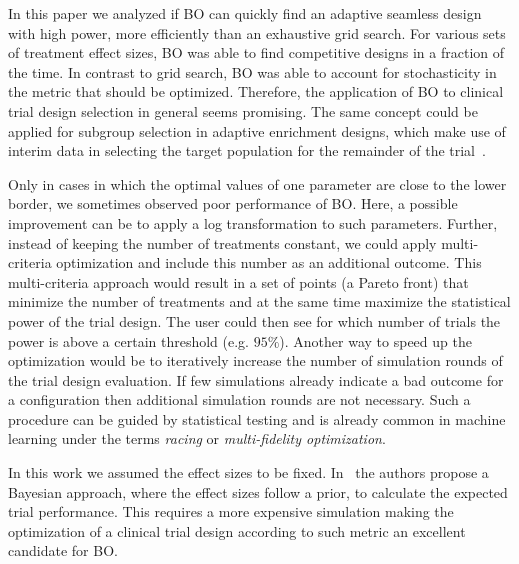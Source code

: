 \documentclass[bimj,fleqn]{w-art}
\theoremstyle{plain}
\theoremstyle{definition}
\begin{document}

In this paper we analyzed if BO can quickly find an adaptive seamless design with high power, more efficiently than an exhaustive grid search.
For various sets of treatment effect sizes, BO was able to find competitive designs in a fraction of the time.
In contrast to grid search, BO was able to account for stochasticity in the metric that should be optimized.
Therefore, the application of BO to clinical trial design selection in general seems promising. The same concept could be applied for subgroup selection in adaptive enrichment designs, which make use of interim data in selecting the target population for the remainder of the trial~\citep{burnett_adaptive_2020}.

Only in cases in which the optimal values of one parameter are close to the lower border, we sometimes observed poor performance of BO.
Here, a possible improvement can be to apply a log transformation to such parameters. %
Further, instead of keeping the number of treatments constant, we could apply multi-criteria optimization and include this number as an additional outcome.
This multi-criteria approach would result in a set of points (a Pareto front) that minimize the number of treatments and at the same time maximize the statistical power of the trial design.
The user could then see for which number of trials the power is above a certain threshold (e.g. $95\%$).
Another way to speed up the optimization would be to iteratively increase the number of simulation rounds of the trial design evaluation. 
If few simulations already indicate a bad outcome for a configuration then additional simulation rounds are not necessary.
Such a procedure can be guided by statistical testing and is already common in machine learning under the terms \emph{racing} or \emph{multi-fidelity optimization}.

In this work we assumed the effect sizes to be fixed. %
In~\citet{stallard_optimal_2009} the authors propose a Bayesian approach, where the effect sizes follow a prior, to calculate the expected trial performance.
This requires a more expensive simulation making the optimization of a clinical trial design according to such metric an excellent candidate for BO.
\end{document}
